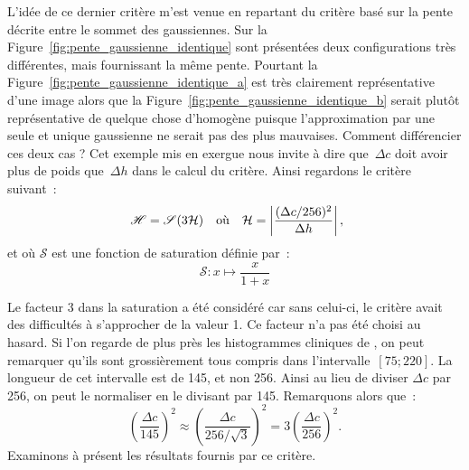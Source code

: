 \documentclass[main.tex]{subfiles}
\begin{document}
L'idée de ce dernier critère m'est venue %
en repartant du critère  %
basé sur la pente décrite entre le sommet des gaussiennes. Sur la Figure~\ref{fig:pente_gaussienne_identique} sont présentées deux configurations très différentes, mais fournissant la même pente. Pourtant la Figure~\ref{fig:pente_gaussienne_identique_a} est très clairement représentative d'une image \heterogene alors que la Figure~\ref{fig:pente_gaussienne_identique_b} serait plutôt représentative de quelque chose d'homogène puisque l'approximation par une seule et unique gaussienne ne serait pas des plus mauvaises. 
Comment différencier ces deux cas ? Cet exemple mis en exergue nous invite à dire que~$\Delta c$ doit avoir plus de poids que~$\Delta h$ dans le calcul du critère\HH. %
Ainsi regardons le critère suivant~:
\begin{equation}\label{eq:def_bon_critere}
~\mathscr{H} = \mathscr{S}(3\mathcal{H}) \quad \textrm{où} \quad \mathcal{H}=\left| \dfrac{(\Delta c /256)^2}{\Delta h} \right|,
\end{equation}
et où $\mathscr{S}$ est une fonction de saturation définie par~:
\begin{equation}
\mathscr{S} : x \mapsto \dfrac{x}{1+x}
\end{equation}

Le facteur 3 dans la saturation a été considéré car sans celui-ci, le critère avait des difficultés à s'approcher de la valeur 1. Ce facteur n'a pas été choisi au hasard. %
Si l'on regarde de plus près les histogrammes cliniques de \Nber, on peut remarquer qu'ils sont grossièrement tous compris dans l'intervalle~$[75;220]$. La longueur de cet intervalle est de 145, et non 256. Ainsi au lieu de diviser $\Delta c$ par 256, on peut le normaliser en le divisant par 145. Remarquons  alors que~:
\begin{equation}
\left(\frac{\Delta c}{145}\right)^2 \approx \left(\frac{\Delta c}{256/\sqrt{3}}\right)^2 =  3 \left(\frac{\Delta c}{256}\right)^2.
\end{equation}
Examinons à présent les résultats fournis par ce critère.
\end{document}
